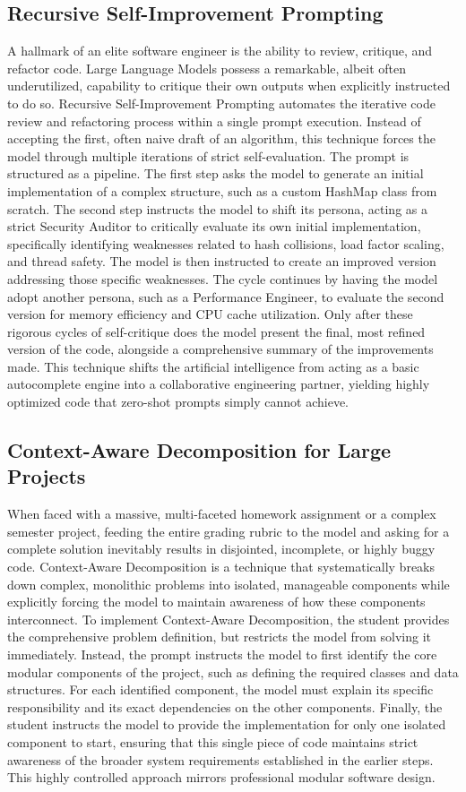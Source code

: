\documentclass[12pt]{article}
\begin{document}
\subsection{Recursive Self-Improvement Prompting}
A hallmark of an elite software engineer is the ability to review, critique, and
refactor code. Large Language Models possess a remarkable, albeit often underutilized, capability to critique
their own outputs when explicitly instructed to do so. Recursive Self-Improvement Prompting automates the
iterative code review and refactoring process within a single prompt execution. Instead of accepting the first,
often naive draft of an algorithm, this technique forces the model through multiple iterations of strict
self-evaluation. The prompt is structured as a pipeline. The first step asks the model to generate an initial
implementation of a complex structure, such as a custom HashMap class from scratch. The second step instructs
the model to shift its persona, acting as a strict Security Auditor to critically evaluate its own initial
implementation, specifically identifying weaknesses related to hash collisions, load factor scaling, and thread
safety. The model is then instructed to create an improved version addressing those specific weaknesses. The
cycle continues by having the model adopt another persona, such as a Performance Engineer, to evaluate the
second version for memory efficiency and CPU cache utilization. Only after these rigorous cycles of
self-critique does the model present the final, most refined version of the code, alongside a comprehensive
summary of the improvements made. This technique shifts the artificial intelligence from acting as a basic
autocomplete engine into a collaborative engineering partner, yielding highly optimized code that zero-shot
prompts simply cannot achieve.

\subsection{Context-Aware Decomposition for Large Projects}
When faced with a
massive, multi-faceted homework assignment or a complex semester project, feeding the entire grading rubric to
the model and asking for a complete solution inevitably results in disjointed, incomplete, or highly buggy
code. Context-Aware Decomposition is a technique that systematically breaks down complex, monolithic problems
into isolated, manageable components while explicitly forcing the model to maintain awareness of how these
components interconnect. To implement Context-Aware Decomposition, the student provides the comprehensive
problem definition, but restricts the model from solving it immediately. Instead, the prompt instructs the
model to first identify the core modular components of the project, such as defining the required classes and
data structures. For each identified component, the model must explain its specific responsibility and its
exact dependencies on the other components. Finally, the student instructs the model to provide the
implementation for only one isolated component to start, ensuring that this single piece of code maintains
strict awareness of the broader system requirements established in the earlier steps. This highly controlled
approach mirrors professional modular software design.
\end{document}
